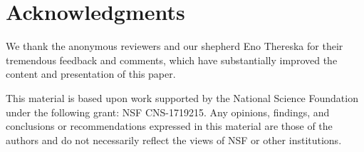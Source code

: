 \section*{Acknowledgments}

We thank the anonymous reviewers and our shepherd Eno Thereska
for their tremendous feedback and comments, which have
substantially improved the content and presentation of this paper.

This material is based upon work supported by the National
Science Foundation under the following grant: NSF CNS-1719215.
Any opinions, findings, and conclusions or recommendations
expressed in this material are those of the authors and do not
necessarily reflect the views of NSF or other institutions.
